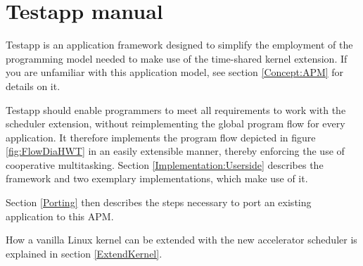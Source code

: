 \chapter{Testapp manual}
\label{Testapp}

Testapp is an application framework designed to simplify the employment of the programming model needed to make use of the time-shared kernel extension. If you are unfamiliar with this application model, see section \ref{Concept:APM} for details on it.

Testapp should enable programmers to meet all requirements to work with the scheduler extension, without reimplementing the global program flow for every application. It therefore implements the program flow depicted in figure \ref{fig:FlowDiaHWT} in an easily extensible manner, thereby enforcing the use of cooperative multitasking. Section \ref{Implementation:Userside} describes the framework and two exemplary implementations, which make use of it.

Section \ref{Porting} then describes the steps necessary to port an existing application to this APM.

How a vanilla Linux kernel can be extended with the new accelerator scheduler is explained in section \ref{ExtendKernel}.

